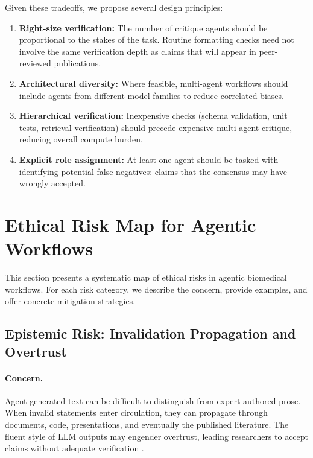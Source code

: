 \documentclass[11pt,letterpaper]{article}
\begin{document}
Given these tradeoffs, we propose several design principles:

\begin{enumerate}[leftmargin=*]
    \item \textbf{Right-size verification:} The number of critique agents should be proportional to the stakes of the task. Routine formatting checks need not involve the same verification depth as claims that will appear in peer-reviewed publications.
    
    \item \textbf{Architectural diversity:} Where feasible, multi-agent workflows should include agents from different model families to reduce correlated biases.
    
    \item \textbf{Hierarchical verification:} Inexpensive checks (schema validation, unit tests, retrieval verification) should precede expensive multi-agent critique, reducing overall compute burden.
    
    \item \textbf{Explicit role assignment:} At least one agent should be tasked with identifying potential false negatives: claims that the consensus may have wrongly accepted.
\end{enumerate}

\section{Ethical Risk Map for Agentic Workflows}
\label{sec:risks}

This section presents a systematic map of ethical risks in agentic biomedical workflows. For each risk category, we describe the concern, provide examples, and offer concrete mitigation strategies.

\subsection{Epistemic Risk: Invalidation Propagation and Overtrust}

\paragraph{Concern.} Agent-generated text can be difficult to distinguish from expert-authored prose. When invalid statements enter circulation, they can propagate through documents, code, presentations, and eventually the published literature. The fluent style of LLM outputs may engender overtrust, leading researchers to accept claims without adequate verification \cite{bang2023}.
\end{document}
